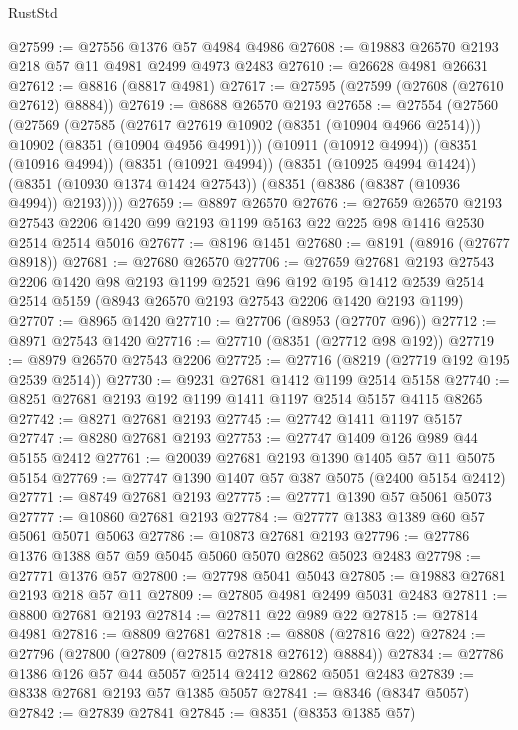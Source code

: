 \begin{lexlean}{RustStd}
\begin{coremodule}
@27599 := @27556 @1376 @57 @4984 @4986
@27608 := @19883 @26570 @2193 @218 @57 @11 @4981 @2499 @4973 @2483
@27610 := @26628 @4981 @26631
@27612 := @8816 (@8817 @4981)
@27617 := @27595 (@27599 (@27608 (@27610 @27612) @8884))
@27619 := @8688 @26570 @2193
@27658 := @27554
    (@27560
      (@27569
        (@27585
          (@27617 @27619 @10902 (@8351 (@10904 @4966 @2514)))
          @10902
          (@8351 (@10904 @4956 @4991)))
        (@10911 (@10912 @4994))
        (@8351 (@10916 @4994))
        (@8351 (@10921 @4994))
        (@8351 (@10925 @4994 @1424))
        (@8351 (@10930 @1374 @1424 @27543))
        (@8351 (@8386 (@8387 (@10936 @4994)) @2193))))
@27659 := @8897 @26570
@27676 := @27659
    @26570
    @2193
    @27543
    @2206
    @1420
    @99
    @2193
    @1199
    @5163
    @22
    @225
    @98
    @1416
    @2530
    @2514
    @2514
    @5016
@27677 := @8196 @1451
@27680 := @8191 (@8916 (@27677 @8918))
@27681 := @27680 @26570
@27706 := @27659
    @27681
    @2193
    @27543
    @2206
    @1420
    @98
    @2193
    @1199
    @2521
    @96
    @192
    @195
    @1412
    @2539
    @2514
    @2514
    @5159
    (@8943 @26570 @2193 @27543 @2206 @1420 @2193 @1199)
@27707 := @8965 @1420
@27710 := @27706 (@8953 (@27707 @96))
@27712 := @8971 @27543 @1420
@27716 := @27710 (@8351 (@27712 @98 @192))
@27719 := @8979 @26570 @27543 @2206
@27725 := @27716 (@8219 (@27719 @192 @195 @2539 @2514))
@27730 := @9231 @27681 @1412 @1199 @2514 @5158
@27740 := @8251 @27681 @2193 @192 @1199 @1411 @1197 @2514 @5157 @4115 @8265
@27742 := @8271 @27681 @2193
@27745 := @27742 @1411 @1197 @5157
@27747 := @8280 @27681 @2193
@27753 := @27747 @1409 @126 @989 @44 @5155 @2412
@27761 := @20039 @27681 @2193 @1390 @1405 @57 @11 @5075 @5154
@27769 := @27747 @1390 @1407 @57 @387 @5075 (@2400 @5154 @2412)
@27771 := @8749 @27681 @2193
@27775 := @27771 @1390 @57 @5061 @5073
@27777 := @10860 @27681 @2193
@27784 := @27777 @1383 @1389 @60 @57 @5061 @5071 @5063
@27786 := @10873 @27681 @2193
@27796 := @27786 @1376 @1388 @57 @59 @5045 @5060 @5070 @2862 @5023 @2483
@27798 := @27771 @1376 @57
@27800 := @27798 @5041 @5043
@27805 := @19883 @27681 @2193 @218 @57 @11
@27809 := @27805 @4981 @2499 @5031 @2483
@27811 := @8800 @27681 @2193
@27814 := @27811 @22 @989 @22
@27815 := @27814 @4981
@27816 := @8809 @27681
@27818 := @8808 (@27816 @22)
@27824 := @27796 (@27800 (@27809 (@27815 @27818 @27612) @8884))
@27834 := @27786 @1386 @126 @57 @44 @5057 @2514 @2412 @2862 @5051 @2483
@27839 := @8338 @27681 @2193 @57 @1385 @5057
@27841 := @8346 (@8347 @5057)
@27842 := @27839 @27841
@27845 := @8351 (@8353 @1385 @57)

\end{coremodule}
\end{lexlean}
